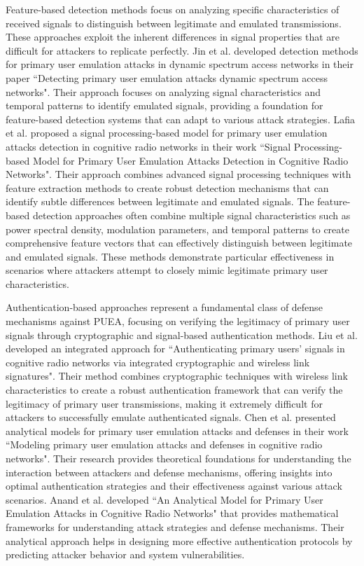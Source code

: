 Feature-based detection methods focus on analyzing specific characteristics of received signals to distinguish between legitimate and emulated transmissions. These approaches exploit the inherent differences in signal properties that are difficult for attackers to replicate perfectly.
Jin et al. \cite{ref15} developed detection methods for primary user emulation attacks in dynamic spectrum access networks in their paper ``Detecting primary user emulation attacks dynamic spectrum access networks". Their approach focuses on analyzing signal characteristics and temporal patterns to identify emulated signals, providing a foundation for feature-based detection systems that can adapt to various attack strategies.
Lafia et al. \cite{ref11} proposed a signal processing-based model for primary user emulation attacks detection in cognitive radio networks in their work ``Signal Processing-based Model for Primary User Emulation Attacks Detection in Cognitive Radio Networks". Their approach combines advanced signal processing techniques with feature extraction methods to create robust detection mechanisms that can identify subtle differences between legitimate and emulated signals.
The feature-based detection approaches often combine multiple signal characteristics such as power spectral density, modulation parameters, and temporal patterns to create comprehensive feature vectors that can effectively distinguish between legitimate and emulated signals. These methods demonstrate particular effectiveness in scenarios where attackers attempt to closely mimic legitimate primary user characteristics.



Authentication-based approaches represent a fundamental class of defense mechanisms against PUEA, focusing on verifying the legitimacy of primary user signals through cryptographic and signal-based authentication methods.
Liu et al. \cite{ref5} developed an integrated approach for ``Authenticating primary users' signals in cognitive radio networks via integrated cryptographic and wireless link signatures". Their method combines cryptographic techniques with wireless link characteristics to create a robust authentication framework that can verify the legitimacy of primary user transmissions, making it extremely difficult for attackers to successfully emulate authenticated signals.
Chen et al. \cite{ref17} presented analytical models for primary user emulation attacks and defenses in their work ``Modeling primary user emulation attacks and defenses in cognitive radio networks". Their research provides theoretical foundations for understanding the interaction between attackers and defense mechanisms, offering insights into optimal authentication strategies and their effectiveness against various attack scenarios.
Anand et al. \cite{ref16} developed ``An Analytical Model for Primary User Emulation Attacks in Cognitive Radio Networks" that provides mathematical frameworks for understanding attack strategies and defense mechanisms. Their analytical approach helps in designing more effective authentication protocols by predicting attacker behavior and system vulnerabilities.



